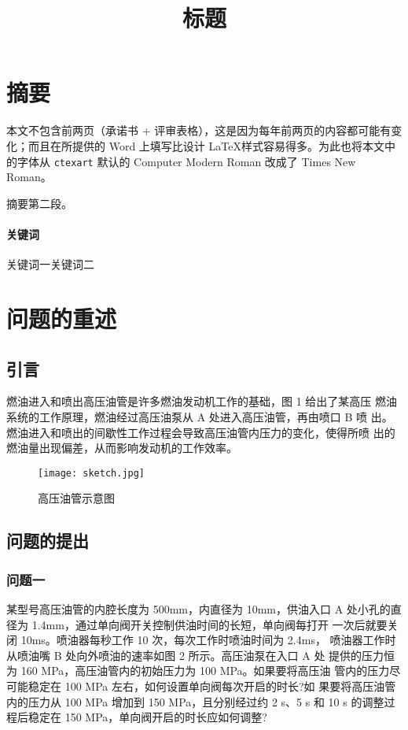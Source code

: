 \documentclass[18pt]{ctexart}
\begin{document}
\pagestyle{plain}
\title{标题}
\author{}
\date{}
\maketitle
\section*{摘要}

本文不包含前两页（承诺书 + 评审表格），这是因为每年前两页的内容都可能有变化；而且在所提供的 Word 上填写比设计 \LaTeX 样式容易得多\cite{someitem}。为此也将本文中的字体从 \verb|ctexart| 默认的 Computer Modern Roman 改成了 Times New Roman。

摘要第二段。

\paragraph*{关键词} 关键词一\quad 关键词二
\newpage
\section{问题的重述}
\subsection{引言}
燃油进入和喷出高压油管是许多燃油发动机工作的基础，图 1 给出了某高压 燃油系统的工作原理，燃油经过高压油泵从 A 处进入高压油管，再由喷口 B 喷 出。燃油进入和喷出的间歇性工作过程会导致高压油管内压力的变化，使得所喷 出的燃油量出现偏差，从而影响发动机的工作效率。

\begin{figure}[h]
    \centering
    \texttt{[image: sketch.jpg]}
    \caption{高压油管示意图}
\end{figure}

\subsection{问题的提出}
\subsubsection{问题一}
某型号高压油管的内腔长度为 500mm，内直径为 10mm，供油入口
A 处小孔的直径为 1.4mm，通过单向阀开关控制供油时间的长短，单向阀每打开 一次后就要关闭 10ms。喷油器每秒工作 10 次，每次工作时喷油时间为 2.4ms， 喷油器工作时从喷油嘴 B 处向外喷油的速率如图 2 所示。高压油泵在入口 A 处 提供的压力恒为 160 MPa，高压油管内的初始压力为 100 MPa。如果要将高压油 管内的压力尽可能稳定在 100 MPa 左右，如何设置单向阀每次开启的时长?如 果要将高压油管内的压力从 100 MPa 增加到 150 MPa，且分别经过约 2 s、5 s 和 10 s 的调整过程后稳定在 150 MPa，单向阀开启的时长应如何调整?
\end{document}
